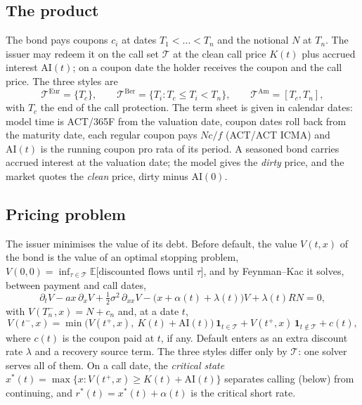 \documentclass[11pt,a4paper]{article}
\newcommand{\E}{\mathbb{E}}
\newcommand{\AI}{\mathrm{AI}}
\begin{document}
\subsection{The product}
The bond pays coupons $c_i$ at dates $T_1 < \dots < T_n$ and the notional $N$ at $T_n$. The issuer may redeem it on
the call set $\mathcal{T}$ at the clean call price $K(t)$ plus accrued interest $\AI(t)$; on a coupon date the holder
receives the coupon and the call price. The three styles are
\begin{equation}
\mathcal{T}^{\mathrm{Eur}} = \{T_c\}, \qquad
\mathcal{T}^{\mathrm{Ber}} = \{T_i : T_c \le T_i < T_n\}, \qquad
\mathcal{T}^{\mathrm{Am}} = [T_c, T_n],
\end{equation}
with $T_c$ the end of the call protection. The term sheet is given in calendar dates: model time is ACT/365F from
the valuation date, coupon dates roll back from the maturity date, each regular coupon pays $Nc/f$ (ACT/ACT ICMA) and
$\AI(t)$ is the running coupon pro rata of its period. A seasoned bond carries accrued interest at the valuation date;
the model gives the \emph{dirty} price, and the market quotes the \emph{clean} price, dirty minus $\AI(0)$.

\subsection{Pricing problem}
The issuer minimises the value of its debt. Before default, the value $V(t,x)$ of the bond is the value of an
optimal stopping problem, $V(0,0) = \inf_{\tau \in \mathcal{T}} \E\big[\text{discounted flows until } \tau\big]$,
and by Feynman--Kac it solves, between payment and call dates,
\begin{equation}\label{eq:pde}
\partial_t V - a x\,\partial_x V + \tfrac12\sigma^2\,\partial_{xx} V - \big(x + \alpha(t) + \lambda(t)\big)V
+ \lambda(t) R N = 0,
\end{equation}
with $V(T_n^-, x) = N + c_n$ and, at a date $t$,
\begin{equation}\label{eq:jump}
V(t^-, x) = \min\big(V(t^+, x),\ K(t) + \AI(t)\big)\,\mathbf{1}_{t \in \mathcal{T}} + V(t^+,x)\,\mathbf{1}_{t \notin \mathcal{T}} + c(t),
\end{equation}
where $c(t)$ is the coupon paid at $t$, if any. Default enters as an extra discount rate $\lambda$ and a recovery
source term. The three styles differ only by $\mathcal{T}$: one solver serves all of them. On a call date, the
\emph{critical state} $x^*(t) = \max\{x : V(t^+,x) \ge K(t) + \AI(t)\}$ separates calling (below) from continuing,
and $r^*(t) = x^*(t) + \alpha(t)$ is the critical short rate.
\end{document}

